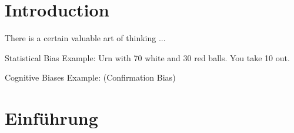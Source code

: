 \ifEnglish

\section{Introduction}


\begin{frame}[standout]
    There is a certain valuable art of thinking ...
\end{frame}



\begin{frame}[c]{Statistical Bias}
    Example: Urn with 70 white and 30 red balls. \newline
    \newline \pause
    You take 10 out.
\end{frame}

\begin{frame}[c]{Cognitive Biases}
    Example:\pause 
    \newline \pause
    (Confirmation Bias)
\end{frame}

\else

\section{Einführung}



